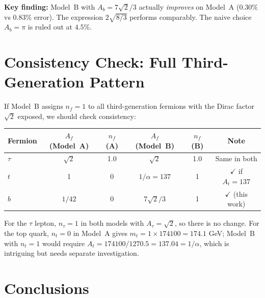 \documentclass[11pt]{article}
\begin{document}
\medskip\noindent
\textbf{Key finding:} Model~B with $A_b = 7\sqrt{2}/3$ actually
\emph{improves} on Model~A ($0.30\%$ vs $0.83\%$ error).  The
expression $2\sqrt{8/3}$ performs comparably.  The naive choice
$A_b = \pi$ is ruled out at $4.5\%$.

\section{Consistency Check: Full Third-Generation Pattern}

If Model~B assigns $n_f = 1$ to all third-generation fermions with
the Dirac factor $\sqrt{2}$ exposed, we should check consistency:

\medskip
\begin{center}
\begin{tabular}{lccccc}
\toprule
Fermion & $A_f$ (Model~A) & $n_f$ (A) & $A_f$ (Model~B) & $n_f$ (B) & Note \\
\midrule
$\tau$ & $\sqrt{2}$ & 1.0 & $\sqrt{2}$ & 1.0 & Same in both \\
$t$    & 1          & 0   & $1/\alpha = 137$ & 1 & $\checkmark$ if $A_t = 137$ \\
$b$    & $1/42$     & 0   & $7\sqrt{2}/3$     & 1 & $\checkmark$ (this work) \\
\bottomrule
\end{tabular}
\end{center}

\medskip\noindent
For the $\tau$ lepton, $n_\tau = 1$ in both models with $A_\tau = \sqrt{2}$,
so there is no change.  For the top quark, $n_t = 0$ in Model~A gives
$m_t = 1 \times 174100 = 174.1$ GeV; Model~B with $n_t = 1$ would require
$A_t = 174100/1270.5 = 137.04 = 1/\alpha$, which is intriguing but
needs separate investigation.

\section{Conclusions}
\end{document}
